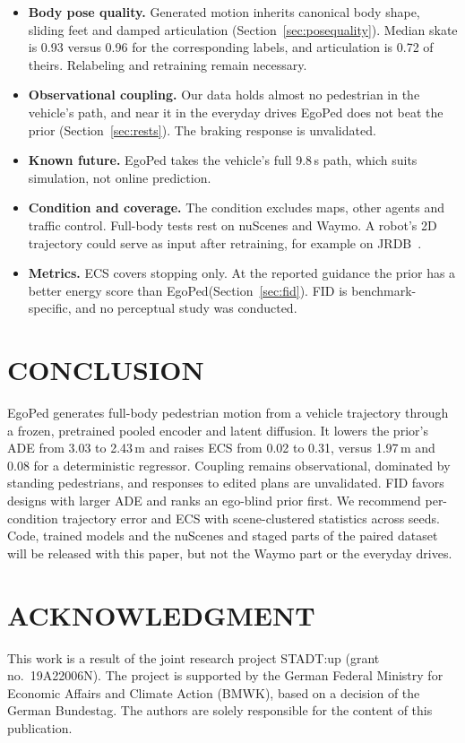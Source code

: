 \documentclass[letterpaper, 10 pt, conference]{ieeeconf}
\newcommand{\method}{EgoPed\xspace}
\newif\ifanonymous
\begin{document}
\begin{itemize}
  \item \textbf{Body pose quality.} Generated motion inherits canonical body shape, sliding feet and damped articulation (Section~\ref{sec:posequality}). Median skate is 0.93 versus 0.96 for the corresponding labels, and articulation is 0.72 of theirs. Relabeling and retraining remain necessary.
  \item \textbf{Observational coupling.} Our data holds almost no pedestrian in the vehicle's path, and near it in the everyday drives \method does not beat the prior (Section~\ref{sec:rests}). The braking response is unvalidated.
  \item \textbf{Known future.} \method takes the vehicle's full 9.8\,s path, which suits simulation, not online prediction.
  \item \textbf{Condition and coverage.} The condition excludes maps, other agents and traffic control. Full-body tests rest on nuScenes and Waymo. A robot's 2D trajectory could serve as input after retraining, for example on JRDB~\cite{martinmartin2023jrdb}.
  \item \textbf{Metrics.} ECS covers stopping only. At the reported guidance the prior has a better energy score than \method (Section~\ref{sec:fid}). FID is benchmark-specific, and no perceptual study was conducted.
\end{itemize}

\section{CONCLUSION}

\method generates full-body pedestrian motion from a vehicle trajectory through a frozen, pretrained pooled encoder and latent diffusion. It lowers the prior's ADE from 3.03 to 2.43\,m and raises ECS from 0.02 to 0.31, versus 1.97\,m and 0.08 for a deterministic regressor. Coupling remains observational, dominated by standing pedestrians, and responses to edited plans are unvalidated. FID favors designs with larger ADE and ranks an ego-blind prior first. We recommend per-condition trajectory error and ECS with scene-clustered statistics across seeds. Code, trained models and the nuScenes and staged parts of the paired dataset will be released with this paper, but not the Waymo part or the everyday drives.

\ifanonymous\else
\section*{ACKNOWLEDGMENT}
This work is a result of the joint research project STADT:up (grant no.\ 19A22006N). The project is supported by the German Federal Ministry for Economic Affairs and Climate Action (BMWK), based on a decision of the German Bundestag. The authors are solely responsible for the content of this publication.
\fi



\end{document}
